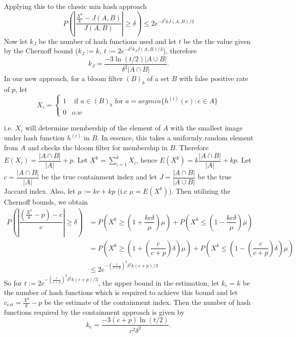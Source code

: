 \documentclass[11pt]{amsart}
\theoremstyle{remark}
\numberwithin{equation}{section}
\begin{document}
Applying this to the classic min hash approach
$$P\left( \left|\dfrac{\frac{X^k}{k}-J(A,B)}{J(A,B)}\right|\geq\delta\right)\leq 2e^{-\delta^2kJ(A,B)/3}$$
Now let $k_J$ be the number of hash functions used and let $t$ be the the value given by the Chernoff bound ($k_J:=k,\ t:=2e^{-\delta^2k_JJ(A,B)/3}$), therefore
$$k_J=\dfrac{-3\ln(t/2)|A\cup B|}{\delta^2 |A\cap B|}.$$
In our new approach, for a bloom filter $(B)_b$ of a set $B$ with false positive rate of $p$, let 
$$X_i=\left\{
\begin{array}{ll}
1&\text{ if } a\in(B)_b\text{ for } a=argmin\{h^{(i)}{(e)}:e\in A\}\\
0& o.w
\end{array}
\right.$$

i.e. $X_i$ will determine membership of the element of $A$ with the smallest image under hash function $h^{(i)}$ in $B$. In essence, this takes a uniformly random element from $A$ and checks the bloom filter for membership in $B$. Therefore $E(X_i)=\dfrac{|A\cap B|}{|A|}+p$. Let 
$X^k=\sum\limits_{i=1}^k X_i$, hence $ E(X^k)=k\dfrac{|A\cap B|}{|A|}+kp$. Let 
$c= \dfrac{|A\cap B|}{|A|}$ be the true containment index and let  $J= \dfrac{|A\cap B|}{|A\cup B|} $ be the true Jaccard index. Also, let $\mu:=k c+k p$ (i.c $\mu=E(X^k)$). Then utilizing the Chernoff bounds, we obtain
\begin{align*}
P\left(
\left|\dfrac{\left(\frac{X^k}{k}-p\right)-c}{c}\right|\geq \delta\right)
&=P\left(X^k\geq\left(1+\dfrac{kc\delta}{\mu}\right)\mu\right) +P\left(X^k\leq \left(1-\dfrac{kc\delta}{\mu}\right)\mu\right)\\
&=P\left( X^k\geq\left( 1+\left(\dfrac{c}{c+p}\right)\delta\right)\mu\right) + P\left(X^k\leq\left(1-\left(\dfrac{c}{c+p}\right)\delta\right)\mu\right)\\
&\leq 2e^{-\left(\frac{c}{c+p}\right)^2\delta^2k(c+p)/3}
\end{align*}
So for $t:=2e^{-\left(\frac{c}{c+p}\right)^2\delta^2k(c+p)/3}$, the upper bound in the estimation, let $k_c=k$ be the number of hash functions which is required to achieve this bound and let $c_{est}=\frac{X^k}{k}-p$ be the estimate of the containment index. Then the number of hash functions required by the containment approach is given by
$$k_c=\dfrac{-3(c+p)\ln(t/2)}{c^2\delta^2}.$$
\end{document}
